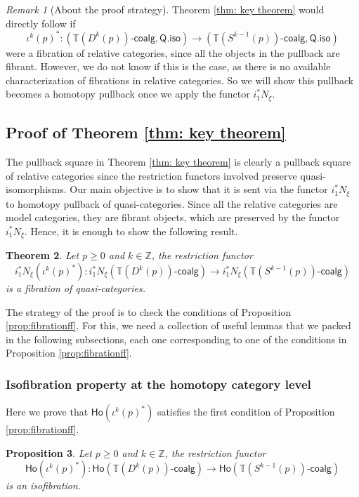 \documentclass[a4paper,12pt]{amsart}
\newcommand{\ho}[1]{\mathsf{Ho}(#1)}
\newcommand{\onecoalg}[1]{#1\text{-}\mathsf{coalg}}
\theoremstyle{plain}
\newtheorem{theorem}{Theorem}[section]
\newtheorem{proposition}[theorem]{Proposition}%
\theoremstyle{definition}
\theoremstyle{remark}
\newtheorem{remark}[theorem]{\sc Remark}%
\begin{document}
\begin{remark}[About the proof strategy]
Theorem \ref{thm: key theorem} would directly follow if 
\[
\iota^k(p)^*: (\onecoalg{\mathbb{T}(D^k(p))},\mathsf{Q.iso}) \longrightarrow (\onecoalg{\mathbb{T}(S^{k-1}(p))},\mathsf{Q.iso})
\]
were a fibration of relative categories, since all the objects in the pullback are fibrant. However, we do not know if this is the case, as there is no available characterization of fibrations in relative categories. So we will show this pullback becomes a homotopy pullback once we apply the functor $i_1^*N_{\xi}$. 
\end{remark}

\subsection{Proof of Theorem \ref{thm: key theorem}}\label{S: the gluing proof}
The pullback square in Theorem \ref{thm: key theorem} is clearly a pullback square of relative categories since the restriction functors involved preserve quasi-isomorphisms. Our main objective is to show that it is sent via the functor $i_1^*N_{\xi}$ to homotopy pullback of quasi-categories. Since all the relative categories are model categories, they are fibrant objects, which are preserved by the functor $i_1^*N_{\xi}$. Hence, it is enough to show the following result.

\begin{theorem}\label{thm: fibrationquasicat}
Let $p \geq 0$ and $k \in \mathbb{Z}$, the restriction functor 
\[
i_1^*N_{\xi}(\iota^k(p)^*):i_1^*N_{\xi}\left(\onecoalg{\mathbb{T}(D^k(p))} \right)\longrightarrow i_1^*N_{\xi} \left(\onecoalg{\mathbb{T}(S^{k-1}(p))}\right)
\]
is a fibration of quasi-categories.
\end{theorem}

The strategy of the proof is to check the conditions of Proposition \ref{prop:fibrationff}. For this, we need a collection of useful lemmas that we packed in the following subsections, each one corresponding to one of the conditions in Proposition \ref{prop:fibrationff}.

\subsubsection{Isofibration property at the homotopy category level} Here we prove that $\ho{\iota^k(p)^*}$ satisfies the first condition of Proposition \ref{prop:fibrationff}.

\begin{proposition}\label{prop: isofibration}
Let $p \geq 0$ and $k \in \mathbb{Z}$, the restriction functor 
\[
\ho{\iota^k(p)^*}: \ho{\onecoalg{\mathbb{T}(D^{k}(p))}} \longrightarrow \ho{\onecoalg{\mathbb{T}(S^{k-1}(p))}}
\]
is an isofibration.
\end{proposition}
\end{document}
